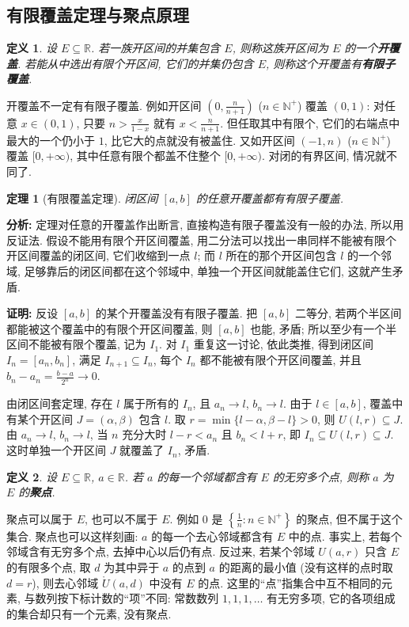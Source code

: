 \documentclass[UTF8,openany]{ctexbook}
\theoremstyle{chinesetextbook}
\newtheorem{definition}{定义}[section]
\newtheorem{theorem}{定理}[section]
\newenvironment{cnproof}{\par\indent\textbf{证明:} \ignorespaces}{\par}
\begin{document}
\subsection{有限覆盖定理与聚点原理}
\begin{definition}
设 $E\subseteq\mathbb R$. 若一族开区间的并集包含 $E$, 则称这族开区间为 $E$ 的一个\textbf{开覆盖}. 若能从中选出有限个开区间, 它们的并集仍包含 $E$, 则称这个开覆盖有\textbf{有限子覆盖}.
\end{definition}
开覆盖不一定有有限子覆盖. 例如开区间 $\displaystyle\left(0,\frac n{n+1}\right)$ ($n\in\mathbb N^+$) 覆盖 $(0,1)$: 对任意 $x\in(0,1)$, 只要 $\displaystyle n>\frac x{1-x}$ 就有 $\displaystyle x<\frac n{n+1}$. 但任取其中有限个, 它们的右端点中最大的一个仍小于 $1$, 比它大的点就没有被盖住. 又如开区间 $(-1,n)$ ($n\in\mathbb N^+$) 覆盖 $[0,+\infty)$, 其中任意有限个都盖不住整个 $[0,+\infty)$. 对闭的有界区间, 情况就不同了.
\begin{theorem}[有限覆盖定理]
闭区间 $[a,b]$ 的任意开覆盖都有有限子覆盖.
\end{theorem}
\par\indent\textbf{分析:} 定理对任意的开覆盖作出断言, 直接构造有限子覆盖没有一般的办法, 所以用反证法. 假设不能用有限个开区间覆盖, 用二分法可以找出一串同样不能被有限个开区间覆盖的闭区间, 它们收缩到一点 $l$; 而 $l$ 所在的那个开区间包含 $l$ 的一个邻域, 足够靠后的闭区间都在这个邻域中, 单独一个开区间就能盖住它们, 这就产生矛盾.
\begin{cnproof}
反设 $[a,b]$ 的某个开覆盖没有有限子覆盖. 把 $[a,b]$ 二等分, 若两个半区间都能被这个覆盖中的有限个开区间覆盖, 则 $[a,b]$ 也能, 矛盾; 所以至少有一个半区间不能被有限个覆盖, 记为 $I_1$. 对 $I_1$ 重复这一讨论, 依此类推, 得到闭区间 $I_n=[a_n,b_n]$, 满足 $I_{n+1}\subseteq I_n$, 每个 $I_n$ 都不能被有限个开区间覆盖, 并且 $\displaystyle b_n-a_n=\frac{b-a}{2^n}\to0$.

由闭区间套定理, 存在 $l$ 属于所有的 $I_n$, 且 $a_n\to l$, $b_n\to l$. 由于 $l\in[a,b]$, 覆盖中有某个开区间 $J=(\alpha,\beta)$ 包含 $l$. 取 $r=\min\{l-\alpha,\beta-l\}>0$, 则 $U(l,r)\subseteq J$. 由 $a_n\to l$, $b_n\to l$, 当 $n$ 充分大时 $l-r<a_n$ 且 $b_n<l+r$, 即 $I_n\subseteq U(l,r)\subseteq J$. 这时单独一个开区间 $J$ 就覆盖了 $I_n$, 矛盾.
\end{cnproof}
\begin{definition}
设 $E\subseteq\mathbb R$, $a\in\mathbb R$. 若 $a$ 的每一个邻域都含有 $E$ 的无穷多个点, 则称 $a$ 为 $E$ 的\textbf{聚点}.
\end{definition}
聚点可以属于 $E$, 也可以不属于 $E$. 例如 $0$ 是 $\displaystyle\left\{\frac1n:n\in\mathbb N^+\right\}$ 的聚点, 但不属于这个集合. 聚点也可以这样刻画: $a$ 的每一个去心邻域都含有 $E$ 中的点. 事实上, 若每个邻域含有无穷多个点, 去掉中心以后仍有点. 反过来, 若某个邻域 $U(a,r)$ 只含 $E$ 的有限多个点, 取 $d$ 为其中异于 $a$ 的点到 $a$ 的距离的最小值 (没有这样的点时取 $d=r$), 则去心邻域 $\mathring U(a,d)$ 中没有 $E$ 的点. 这里的“点”指集合中互不相同的元素, 与数列按下标计数的“项”不同: 常数数列 $1,1,1,\ldots$ 有无穷多项, 它的各项组成的集合却只有一个元素, 没有聚点.
\end{document}
